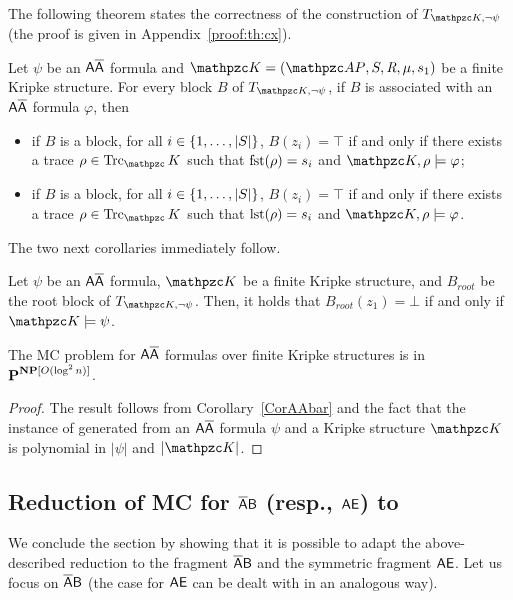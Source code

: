 The following theorem states the correctness of the construction of $T_{\Ku,\neg\psi}$ (the proof is given in Appendix~\ref{proof:th:cx}).

\begin{theorem}\label{th:cx} 
Let $\psi$  be an $\mathsf{A\overline{A}}$ formula and  $\Ku=(\Prop,\States,\Edges,\Lab,s_1)$ be a finite Kripke structure.
For every block $B$ of $T_{\Ku,\neg\psi}$,
if $B$ is associated with an $\mathsf{A\overline{A}}$ formula $\varphi$, then
\begin{itemize}
	\item if $B$ is a \forw{} block, for all $i\in\{1,\ldots,|S|\}$, $B(z_i)=\top$ if and only if there exists a trace $\rho\in\Trk_\Ku$ such that $\operatorname{fst}(\rho)=s_i$ and $\Ku,\rho\models\varphi$;
	\item if $B$ is a \back{} block, for all $i\in\{1,\ldots,|S|\}$, $B(z_i)=\top$ if and only if there exists a trace $\rho\in\Trk_\Ku$ such that $\operatorname{lst}(\rho)=s_i$ and $\Ku,\rho\models\varphi$.
\end{itemize}
\end{theorem}


The two next corollaries immediately follow.

\begin{corollary}\label{CorAAbar}
Let $\psi$ be an $\mathsf{A\overline{A}}$ formula, $\Ku$
be a finite Kripke structure,
and $B_{root}$ be the root block of $T_{\Ku,\neg\psi}$. Then, it holds that
$B_{root}(z_1)=\bot$ if and only if $\Ku\models\psi$.
\end{corollary}

\begin{corollary}\label{th:AAbaralgo}
The MC problem for $\mathsf{A\overline{A}}$ formulas over finite Kripke structures is in $\textbf{P}^{\textbf{NP}[O(\log^2 n)]}$.
\end{corollary}
\begin{proof}
The result follows from Corollary~\ref{CorAAbar} and the fact that the instance of \TBSATM{} generated from an $\mathsf{A\overline{A}}$ formula $\psi$ and 
a Kripke structure $\Ku$ is polynomial in $|\psi|$ and $|\Ku|$.
\end{proof}

\subsection{Reduction of MC for $\mathsf{\overline{A}B}$ (resp., $\mathsf{AE}$) to \TBSATM }

We conclude the section by showing that it is possible to adapt the above-described reduction to the fragment $\mathsf{\overline{A}B}$ and the symmetric fragment $\mathsf{AE}$.
Let us focus on $\mathsf{\overline{A}B}$ (the case for $\mathsf{AE}$ can be dealt with in an analogous way).

